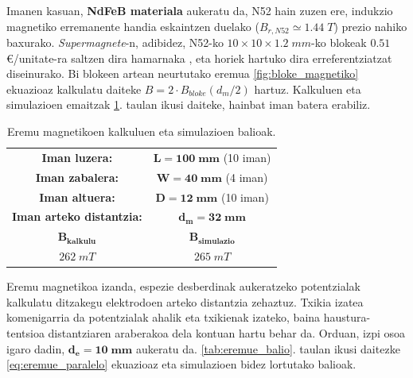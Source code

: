\documentclass[12pt]{article}
\numberwithin{figure}{section}
\numberwithin{equation}{section}
\begin{document}
Imanen kasuan, \textbf{NdFeB materiala} aukeratu da, N52 hain zuzen ere, indukzio magnetiko erremanente handia eskaintzen duelako ($B_{r,N52}\simeq \num{1.44}\;T$) prezio nahiko baxurako. \textit{Supermagnete}-n, adibidez, N52-ko $10\times10\times\num{1.2}\;mm$-ko blokeak $\num{0.51}$€/unitate-ra saltzen dira hamarnaka \cite{ag_bloque_nodate}, eta horiek hartuko dira erreferentziatzat diseinurako. Bi blokeen artean neurtutako eremua \ref{fig:bloke_magnetiko} ekuazioaz kalkulatu daiteke $B=2\cdot B_{bloke}(d_m/2)$ hartuz. Kalkuluen eta simulazioen emaitzak \ref{tab:eremumag_balio}. taulan ikusi daiteke, hainbat iman batera erabiliz.\\

\begin{table}[h]
    \centering
    \caption{Eremu magnetikoen kalkuluen eta simulazioen balioak.}
    \begin{tabular}{cc}
        \textbf{Iman luzera:} & $\mathbf{L=100\;mm}$ (10 iman)\\
        \textbf{Iman zabalera:} & $\mathbf{W=40\;mm}$ (4 iman)\\
        \textbf{Iman altuera:} & $\mathbf{D=12\;mm}$ (10 iman)\\
        \textbf{Iman arteko distantzia:} & $\mathbf{d_m=32\;mm}$ \\
        \midrule
        \rowcolor{gray!20}
        $\mathbf{B_{kalkulu}}$ & $\mathbf{B_{simulazio}}$\\
        \midrule
        $262\;mT$ & $265\;mT$\\
        \bottomrule
    \end{tabular}
    \label{tab:eremumag_balio}
\end{table}

Eremu magnetikoa izanda, espezie desberdinak aukeratzeko potentzialak kalkulatu ditzakegu elektrodoen arteko distantzia zehaztuz. Txikia izatea komenigarria da potentzialak ahalik eta txikienak izateko, baina haustura-tentsioa distantziaren araberakoa dela kontuan hartu behar da. Orduan, izpi osoa igaro dadin, $\mathbf{d_e=10\;mm}$ aukeratu da. \ref{tab:eremue_balio}. taulan ikusi daitezke \ref{eq:eremue_paralelo} ekuazioaz eta simulazioen bidez lortutako balioak.\\
\end{document}
